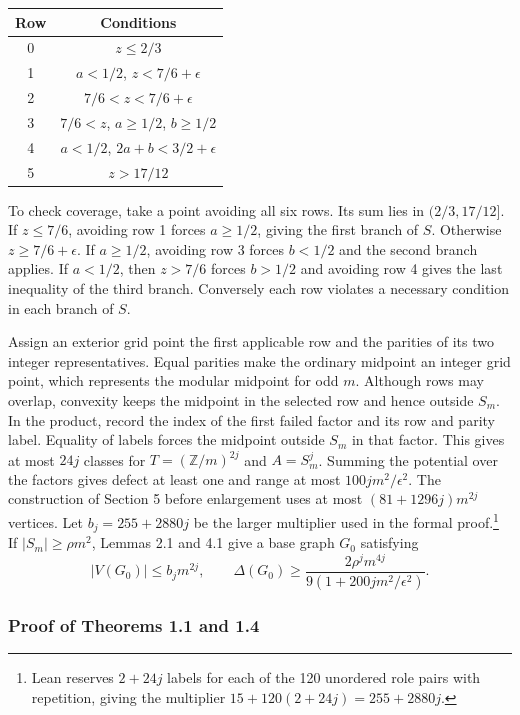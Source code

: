 \documentclass[english,11pt,a4paper]{article}
\begin{document}
\begin{center}
\begin{tabular}{cc}
\toprule
Row & Conditions \\
\midrule
0 & $z\le 2/3$ \\
1 & $a<1/2$, $z<7/6+\epsilon$ \\
2 & $7/6<z<7/6+\epsilon$ \\
3 & $7/6<z$, $a\ge1/2$, $b\ge1/2$ \\
4 & $a<1/2$, $2a+b<3/2+\epsilon$ \\
5 & $z>17/12$ \\
\bottomrule
\end{tabular}
\end{center}

To check coverage, take a point avoiding all six rows. Its sum lies in \((2/3,17/12]\). If \(z\le7/6\), avoiding row 1 forces \(a\ge1/2\), giving the first branch of \(S\). Otherwise \(z\ge7/6+\epsilon\). If \(a\ge1/2\), avoiding row 3 forces \(b<1/2\) and the second branch applies. If \(a<1/2\), then \(z>7/6\) forces \(b>1/2\) and avoiding row 4 gives the last inequality of the third branch. Conversely each row violates a necessary condition in each branch of \(S\).

Assign an exterior grid point the first applicable row and the parities of its two integer representatives. Equal parities make the ordinary midpoint an integer grid point, which represents the modular midpoint for odd \(m\). Although rows may overlap, convexity keeps the midpoint in the selected row and hence outside \(S_m\). In the product, record the index of the first failed factor and its row and parity label. Equality of labels forces the midpoint outside \(S_m\) in that factor. This gives at most \(24j\) classes for \(T=(\mathbb Z/m)^{2j}\) and \(A=S_m^j\). Summing the potential over the factors gives defect at least one and range at most \(100jm^2/\epsilon^2\). The construction of Section 5 before enlargement uses at most \((81+1296j)m^{2j}\) vertices. Let \(b_j=255+2880j\) be the larger multiplier used in the formal proof.\footnote{Lean reserves \(2+24j\) labels for each of the 120 unordered role pairs with repetition, giving the multiplier \(15+120(2+24j)=255+2880j\).} If \(|S_m|\ge\rho m^2\), Lemmas 2.1 and 4.1 give a base graph \(G_0\) satisfying
\[|V(G_0)|\le b_j m^{2j},\qquad
 \Delta(G_0)\ge\frac{2\rho^j m^{4j}}{9(1+200jm^2/\epsilon^2)}.\]

\subsubsection{Proof of Theorems 1.1 and 1.4}\label{proof-of-theorems-1.1-and-1.4}
\end{document}
